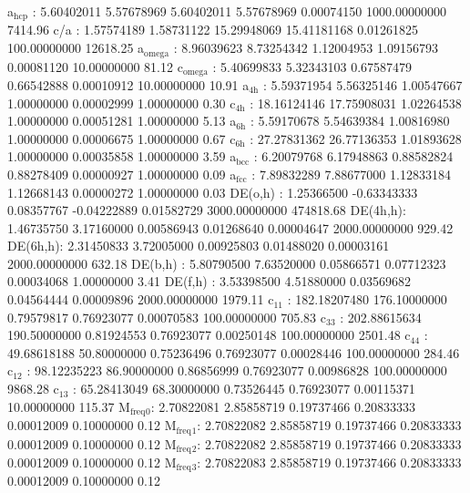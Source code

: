 \documentclass[11pt]{article}
\begin{document}
a\(_{\text{hcp}}\)   :   5.60402011   5.57678969   5.60402011   5.57678969   0.00074150 1000.00000000      7414.96
c/a     :   1.57574189   1.58731122  15.29948069  15.41181168   0.01261825 100.00000000     12618.25
a\(_{\text{omega}}\) :   8.96039623   8.73254342   1.12004953   1.09156793   0.00081120  10.00000000        81.12
c\(_{\text{omega}}\) :   5.40699833   5.32343103   0.67587479   0.66542888   0.00010912  10.00000000        10.91
a\(_{\text{4h}}\)    :   5.59371954   5.56325146   1.00547667   1.00000000   0.00002999   1.00000000         0.30
c\(_{\text{4h}}\)    :  18.16124146  17.75908031   1.02264538   1.00000000   0.00051281   1.00000000         5.13
a\(_{\text{6h}}\)    :   5.59170678   5.54639384   1.00816980   1.00000000   0.00006675   1.00000000         0.67
c\(_{\text{6h}}\)    :  27.27831362  26.77136353   1.01893628   1.00000000   0.00035858   1.00000000         3.59
a\(_{\text{bcc}}\)   :   6.20079768   6.17948863   0.88582824   0.88278409   0.00000927   1.00000000         0.09
a\(_{\text{fcc}}\)   :   7.89832289   7.88677000   1.12833184   1.12668143   0.00000272   1.00000000         0.03
DE(o,h) :   1.25366500  -0.63343333   0.08357767  -0.04222889   0.01582729 3000.00000000    474818.68
DE(4h,h):   1.46735750   3.17160000   0.00586943   0.01268640   0.00004647 2000.00000000       929.42
DE(6h,h):   2.31450833   3.72005000   0.00925803   0.01488020   0.00003161 2000.00000000       632.18
DE(b,h) :   5.80790500   7.63520000   0.05866571   0.07712323   0.00034068   1.00000000         3.41
DE(f,h) :   3.53398500   4.51880000   0.03569682   0.04564444   0.00009896 2000.00000000      1979.11
c\(_{\text{11}}\)    : 182.18207480 176.10000000   0.79579817   0.76923077   0.00070583 100.00000000       705.83
c\(_{\text{33}}\)    : 202.88615634 190.50000000   0.81924553   0.76923077   0.00250148 100.00000000      2501.48
c\(_{\text{44}}\)    :  49.68618188  50.80000000   0.75236496   0.76923077   0.00028446 100.00000000       284.46
c\(_{\text{12}}\)    :  98.12235223  86.90000000   0.86856999   0.76923077   0.00986828 100.00000000      9868.28
c\(_{\text{13}}\)    :  65.28413049  68.30000000   0.73526445   0.76923077   0.00115371  10.00000000       115.37
M\(_{\text{freq}}\)\(_{\text{0}}\):   2.70822081   2.85858719   0.19737466   0.20833333   0.00012009   0.10000000         0.12
M\(_{\text{freq}}\)\(_{\text{1}}\):   2.70822082   2.85858719   0.19737466   0.20833333   0.00012009   0.10000000         0.12
M\(_{\text{freq}}\)\(_{\text{2}}\):   2.70822082   2.85858719   0.19737466   0.20833333   0.00012009   0.10000000         0.12
M\(_{\text{freq}}\)\(_{\text{3}}\):   2.70822083   2.85858719   0.19737466   0.20833333   0.00012009   0.10000000         0.12
\end{document}
